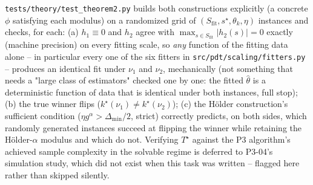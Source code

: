 \texttt{tests/theory/test\_theorem2.py} builds both constructions explicitly (a concrete
$\phi$ satisfying each modulus) on a randomized grid of $(S_{\mathrm{fit}}, s^\star,
\theta_k, \eta)$ instances and checks, for each: (a) $h_1 \equiv 0$ and $h_2$ agree with
$\max_{s \in S_{\mathrm{fit}}} |h_2(s)| = 0$ exactly (machine precision) on every fitting
scale, so \emph{any} function of the fitting data alone -- in particular every one of
the six fitters in \texttt{src/pdt/scaling/fitters.py} -- produces an identical fit
under $\nu_1$ and $\nu_2$, mechanically (not something that needs a "large class of
estimators" checked one by one: the fitted $\hat\theta$ is a deterministic function of
data that is identical under both instances, full stop); (b) the true winner flips
($k^\star(\nu_1) \ne k^\star(\nu_2)$); (c) the H\"older construction's sufficient
condition ($\eta g^\alpha > \Delta_{\min}/2$, strict) correctly predicts, on both sides, which
randomly generated instances succeed at flipping the winner while retaining the
Hölder-$\alpha$ modulus and which do not. Verifying $T^\star$ against the P3 algorithm's
achieved sample complexity in the solvable regime is deferred to P3-04's simulation
study, which did not exist when this task was written -- flagged here rather than
skipped silently.
